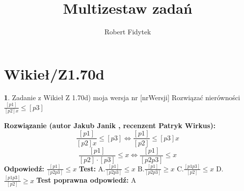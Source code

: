 \documentclass[12pt, a4paper]{article}
\title{Multizestaw zadań}
\author{Robert Fidytek}
\date{}
\theoremstyle{definition} %
\newtheorem{zad}{}
\newcommand{\kategoria}[1]{\section{#1}} %
\newcommand{\zadStart}[1]{\begin{zad}#1\newline} %
\newcommand{\zadStop}{\end{zad}}   %
\newcommand{\rozwStart}[2]{\noindent \textbf{Rozwiązanie (autor #1 , recenzent #2): }\newline} %
\newcommand{\rozwStop}{\newline}                                            %
\newcommand{\odpStart}{\noindent \textbf{Odpowiedź:}\newline}    %
\newcommand{\odpStop}{\newline}                                             %
\newcommand{\testStart}{\noindent \textbf{Test:}\newline} %
\newcommand{\testStop}{\newline} %
\newcommand{\kluczStart}{\noindent \textbf{Test poprawna odpowiedź:}\newline} %
\newcommand{\kluczStop}{\newline} %
\begin{document}
\maketitle


\kategoria{Wikieł/Z1.70d}
\zadStart{Zadanie z Wikieł Z 1.70d) moja wersja nr [nrWersji]}
Rozwiązać nierówności $\frac{[p1]}{[p2]x} \leq [p3]$
\zadStop
\rozwStart{Jakub Janik}{Patryk Wirkus}
$$\frac{[p1]}{[p2]x} \leq [p3] \Leftrightarrow \frac{[p1]}{[p2]} \leq [p3]x$$
$$\frac{[p1]}{[p2]\cdot[p3]} \leq x \Leftrightarrow \frac{[p1]}{[p2p3]} \leq x$$
\rozwStop
\odpStart
$\frac{[p1]}{[p2p3]} \leq x$
\odpStop
\testStart
A.$\frac{[p1]}{[p2p3]} \leq x$
B.$\frac{[p1]}{[p2p3]} \geq x$
C.$\frac{[p1p3]}{[p2]} \leq x$
D.$\frac{[p1p3]}{[p2]} \geq x$
\testStop
\kluczStart
A
\kluczStop
\end{document}
